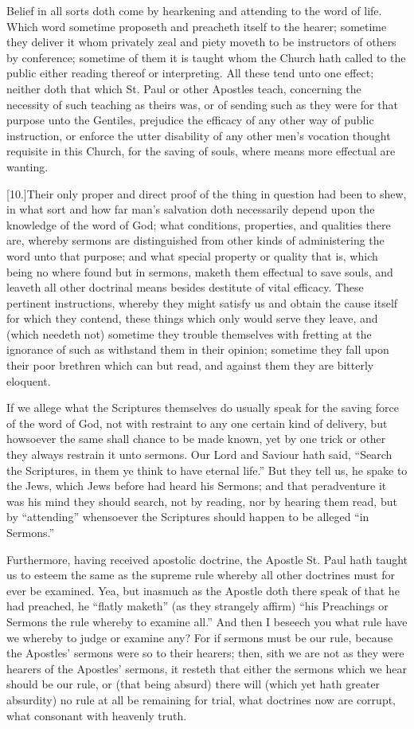 Belief in all sorts doth come by hearkening and attending  to the word of life.
 Which word sometime proposeth and preacheth itself to the hearer; sometime they deliver it whom privately zeal and piety moveth to be instructors of others by conference; sometime of them it is taught whom the Church hath called to the public either reading thereof or interpreting. All these tend unto one effect; neither doth that which St. Paul or other Apostles teach, concerning the necessity of such teaching as theirs was, or of sending such as they were for that purpose unto the Gentiles, prejudice the efficacy of any other way of public instruction, or enforce the utter disability of any other men’s vocation thought requisite in this Church, for the saving of souls, where means more effectual are wanting.

[10.]Their only proper and direct proof of the thing in question had been to shew, in what sort and how far man’s salvation doth necessarily depend upon the knowledge of the word of God; what conditions, properties, and qualities there are, whereby sermons are distinguished from other kinds of administering the word unto that purpose; and what special property or quality that is, which being no where found but in sermons, maketh them effectual to save souls, and leaveth all other doctrinal means besides destitute of vital efficacy. These pertinent instructions, whereby they might satisfy us and obtain the cause itself for which they contend, these things which only would serve they leave, and (which needeth not) sometime they trouble themselves with fretting at the ignorance of such as withstand them in their opinion; sometime they fall upon their poor brethren which can but read, and against them they are bitterly eloquent.

If we allege what the Scriptures themselves do usually speak for the saving force of the word of God, not with restraint to any one certain kind of delivery, but howsoever the same shall chance to be made known, yet by one trick  or other they always restrain it unto sermons. Our Lord and Saviour hath said, “Search the Scriptures, in them ye think to have eternal life.” But they tell us, he spake to the Jews, which Jews before had heard his Sermons; and that peradventure it was his mind they should search, not by reading, nor by hearing them read, but by “attending” whensoever the Scriptures should happen to be alleged “in Sermons.”

Furthermore, having received apostolic doctrine, the Apostle St. Paul hath taught us to esteem the same as the supreme rule whereby all other doctrines must for ever be examined. Yea, but inasmuch as the Apostle doth there speak of that he had preached, he “flatly maketh” (as they strangely affirm) “his Preachings or Sermons the rule whereby to examine all.” And then I beseech you what rule have we whereby to judge or examine any? For if sermons must be our rule, because the Apostles’ sermons were so to their hearers; then, sith we are not as they were hearers of the Apostles’ sermons, it resteth that either the sermons which we hear should be our rule, or (that being absurd) there will (which yet hath greater absurdity) no rule at all be remaining for trial, what doctrines now are corrupt, what consonant with heavenly truth.

